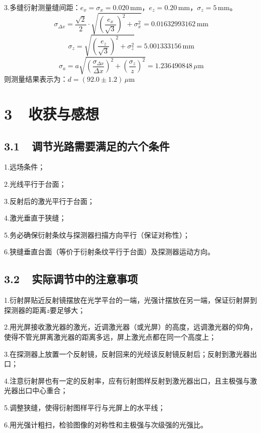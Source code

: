 \documentclass[a4paper,fontset=windows]{ctexbook}
\begin{document}
    \bigskip
    3.多缝衍射测量缝间距：$e_x = \sigma_x = 0.020\,\mathrm{mm}$，$e_z = 0.20\,\mathrm{mm}$，$\sigma_z=5\,\mathrm{mm}$。
    \[
    \sigma_{\Delta x} = \frac{\sqrt{2}}{2}\cdot\sqrt{\left(\frac{e_x}{\sqrt{3}}\right)^2 + \sigma_{x}^2} = 0.01632993162\,\mathrm{mm}
    \]
    \[
    \sigma_z = \sqrt{\left(\frac{e_z}{\sqrt{3}}\right)^2 + \sigma_{z}^2} = 5.001333156\,\mathrm{mm}
    \]
    \[
    \sigma_a = a\sqrt{\left(\frac{\sigma_{\Delta x}}{\Delta x}\right)^2 + \left(\frac{\sigma_z}{z}\right)^2} = 1.236490848\,\mu\mathrm{m}
    \]
    则测量结果表示为：$d = (92.0\pm1.2)\,\mu\mathrm{m}$

    \newpage
    \section*{ 3\ \ 收获与感想}

    \subsection*{ 3.1\ \ 调节光路需要满足的六个条件}

    1.远场条件；

    2.光线平行于台面；

    3.反射后的激光平行于台面；

    4.激光垂直于狭缝；

    5.务必确保衍射条纹与探测器扫描方向平行（保证对称性）；

    6.狭缝垂直台面（等价于衍射条纹平行于台面）及探测器运动方向。

    \subsection*{ 3.2\ \ 实际调节中的注意事项}

    1.衍射屏贴近反射镜摆放在光学平台的一端，光强计摆放在另一端，保证衍射屏到探测器的距离$z$要足够大；

    2.用光屏接收激光器的激光，近调激光器（或光屏）的高度，远调激光器的仰角，使得不管光屏离激光器的距离多远，屏上激光点都在同一个高度上；

    3.在探测器上放置一个反射镜，反射回来的光经该反射镜反射后；反射到激光器出口；

    4.注意衍射屏也有一定的反射率，应有衍射图样反射到激光器出口，且主极强与激光器出口中心重合；

    5.调整狭缝，使得衍射图样平行与光屏上的水平线；

    6.用光强计粗扫，检验图像的对称性和主极强与次级强的光强比。
\end{document}
